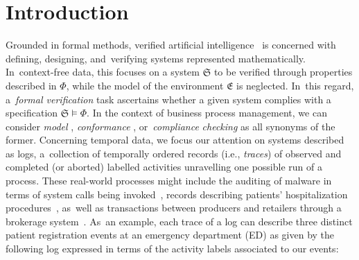 \documentclass[information,article,accept,pdftex,oneauthor]{Definitions/mdpi}
\newcommand{\spec}{\ensuremath{\Phi}}
\newcommand{\LOG}{\ensuremath{\mathfrak{S}}}
\begin{document}
%
%

\section{Introduction}
Grounded in formal methods, verified artificial intelligence~\cite{DBLP:journals/cacm/SeshiaSS22} is concerned with defining, designing, and~verifying   systems represented mathematically. In~context-free data, this focuses on a system $\LOG$ to be verified through properties described in $\spec$, while the model of the environment $\mathfrak{E}$ is neglected. In~this regard, a~\textit{{formal verification}%
} task ascertains whether a given system complies with a specification $\LOG\vDash \spec$. 
In the context of business process management, we can consider \textit{model} \cite{DBLP:books/daglib/0020348}, \textit{conformance} \cite{DBLP:conf/bpm/BergamiMMM21}, or~\textit{compliance} \cite{DBLP:conf/bpm/AwadDW08,WEIDLICH20111009} \textit{checking} as all synonyms of the former. Concerning temporal data, we focus our attention on systems described as logs, a~collection of temporally ordered records (i.e., \textit{traces}) of observed and completed (or aborted) labelled activities unravelling one possible run of a process. These real-world processes might include the auditing of malware in terms of system calls being invoked~\cite{10.7717/peerj-cs.346,DBLP:conf/siu/YaziCG19}, records describing patients' hospitalization procedures~\cite{8782520,XuPYYLZ20,https://doi.org/10.4121/uuid:d9769f3d-0ab0-4fb8-803b-0d1120ffcf54}, as~well as transactions between producers and retailers through a brokerage system~\cite{DBLP:conf/wbdb/PetermannJMR14}. As~an example, each trace of a log can describe three distinct patient registration events at an emergency department (ED) \cite{Petsis2022} as given by the following log expressed in terms of the activity labels associated to our {events:} %
\end{document}
